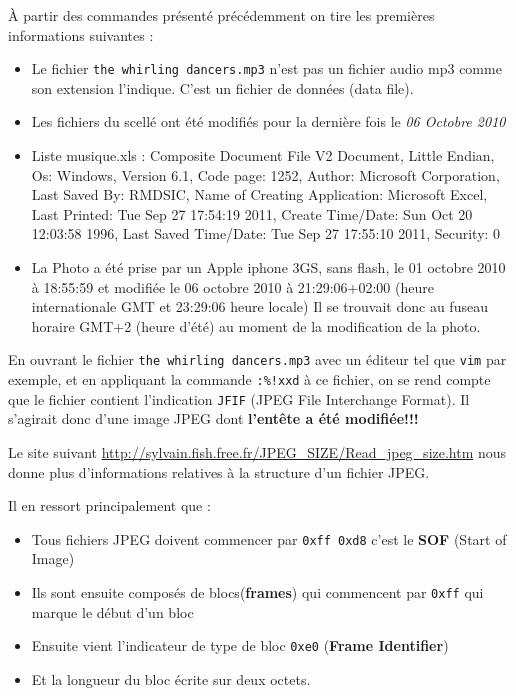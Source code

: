 \documentclass[a4paper,11pt]{article}
\begin{document}
À partir des commandes présenté précédemment on tire les premières informations suivantes :
\begin{itemize}
    \item  Le fichier {\tt the whirling dancers.mp3} n'est pas un fichier
        audio mp3 comme son extension l'indique.
        C'est un fichier de données (data file).
    \item Les fichiers du scellé ont été modifiés pour la dernière fois le \emph{06 Octobre 2010}

    \item Liste musique.xls :
    Composite Document File V2 Document, Little Endian, Os:
    Windows, Version 6.1, Code page: 1252, Author: Microsoft Corporation, Last Saved By:
    RMDSIC, Name of Creating Application: Microsoft Excel, Last Printed: Tue Sep 27 17:54:19
    2011, Create Time/Date: Sun Oct 20 12:03:58 1996, Last Saved Time/Date: Tue Sep 27
    17:55:10 2011, Security: 0

    \item La Photo a été prise par un Apple iphone 3GS, sans flash,  le 01 octobre 2010 à 18:55:59 et modifiée
  le 06 octobre 2010 à 21:29:06+02:00 (heure internationale GMT et 23:29:06 heure locale)
 Il se trouvait donc au fuseau horaire GMT+2 (heure d'été) au moment de la modification de la
photo.
\end{itemize}

En ouvrant le fichier {\tt the whirling dancers.mp3} avec un éditeur tel que {\tt vim} par
exemple, et en appliquant la commande {\tt :\%!xxd} à ce fichier, on se rend compte que le
fichier contient l'indication {\tt JFIF} (JPEG File Interchange Format). Il s'agirait donc
d'une image JPEG dont {\bf l'entête a été modifiée!!!}

Le site suivant \url{http://sylvain.fish.free.fr/JPEG\_SIZE/Read\_jpeg\_size.htm} nous donne
plus d'informations relatives à la structure d'un fichier JPEG.

Il en ressort principalement que :
\begin{itemize}
    \item Tous fichiers JPEG doivent commencer par {\tt 0xff 0xd8} c'est le {\bf SOF} (Start of Image)
    \item Ils sont ensuite composés de blocs({\bf frames}) qui commencent par {\tt 0xff} qui marque le
  début d'un bloc
    \item Ensuite vient l'indicateur de type de bloc {\tt 0xe0} ({\bf Frame Identifier})
    \item Et la longueur du bloc écrite sur deux octets.
\end{itemize}
\end{document}
